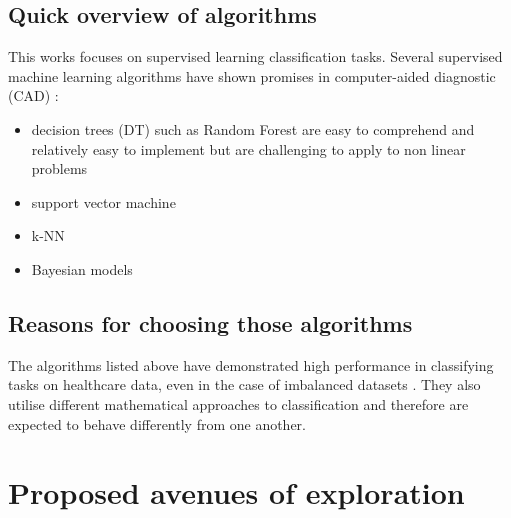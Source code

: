 \subsection{Quick overview of algorithms}
This works focuses on supervised learning classification tasks. Several supervised machine learning algorithms have shown promises in computer-aided diagnostic (CAD) \citep{Dua:2014dz}:
\begin{itemize}
    \item decision trees (DT) such as Random Forest are easy to comprehend and relatively easy to implement but are challenging to apply to non linear problems \citep{Gray:2013eh}
    \item support vector machine \citep{Naraei:ct}
    \item k-NN \citep{Liu:2011dz}
    \item Bayesian models \citep{Dangare:ut}
\end{itemize}

\subsection{Reasons for choosing those algorithms}
The algorithms listed above have demonstrated high performance in classifying tasks on healthcare data, even in the case of imbalanced datasets \citep{Dua:2014dz}. They also utilise different mathematical approaches to classification and therefore are expected to behave differently from one another.



\section{Proposed avenues of exploration}
